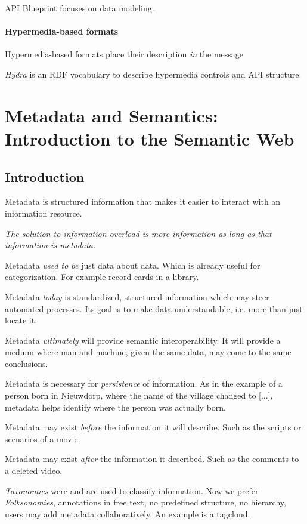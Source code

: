 \documentclass{report}
\begin{document}
API Blueprint focuses on data modeling.

\subsubsection{Hypermedia-based formats}

Hypermedia-based formats place
their description \emph{in} the message

\emph{Hydra} is an RDF vocabulary
to describe hypermedia controls and API structure.

\chapter{Metadata and Semantics: Introduction to the Semantic Web}

\section{Introduction}

Metadata is structured information
that makes it easier to interact
with an information resource.

\textit{
  The solution to information overload is more information
  as long as that information is metadata.
}

Metadata \emph{used to be} just data about data.
Which is already useful for categorization.
For example record cards in a library.

Metadata \emph{today} is standardized, structured information
which may steer automated processes.
Its goal is to make data understandable,
i.e. more than just locate it.

Metadata \emph{ultimately} will provide semantic interoperability.
It will provide a medium where man and machine,
given the same data, may come to the same conclusions.

Metadata is necessary for \emph{persistence} of information.
As in the example of a person born in Nieuwdorp,
where the name of the village changed to [...],
metadata helps identify where the person was actually born.

Metadata may exist \emph{before} the information it will describe.
Such as the scripts or scenarios of a movie.

Metadata may exist \emph{after} the information it described.
Such as the comments to a deleted video.

\emph{Taxonomies} were and are used to classify information.
Now we prefer \emph{Folksonomies}, annotations in free text,
no predefined structure, no hierarchy,
users may add metadata collaboratively.
An example is a tagcloud.
\end{document}
